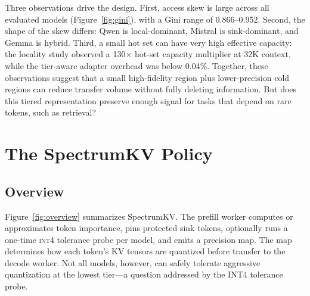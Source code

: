 \documentclass[11pt]{article}
\newcommand{\method}{SpectrumKV}
\newcommand{\pct}{\%}
\newcommand{\intiv}{\textsc{int4}}
\theoremstyle{plain}
\theoremstyle{definition}
\begin{document}
Three observations drive the design.  First, access skew is large across all evaluated models (Figure~\ref{fig:gini}), with a Gini range of 0.866--0.952.  Second, the shape of the skew differs: Qwen is local-dominant, Mistral is sink-dominant, and Gemma is hybrid.  Third, a small hot set can have very high effective capacity: the locality study observed a 130$\times$ hot-set capacity multiplier at 32K context, while the tier-aware adapter overhead was below 0.04\pct{}.  Together, these observations suggest that a small high-fidelity region plus lower-precision cold regions can reduce transfer volume without fully deleting information.  But does this tiered representation preserve enough signal for tasks that depend on rare tokens, such as retrieval?

\section{The \method{} Policy}
\label{sec:method}

\subsection{Overview}
Figure~\ref{fig:overview} summarizes \method{}.  The prefill worker computes or approximates token importance, pins protected sink tokens, optionally runs a one-time \intiv{} tolerance probe per model, and emits a precision map.  The map determines how each token's KV tensors are quantized before transfer to the decode worker.  Not all models, however, can safely tolerate aggressive quantization at the lowest tier---a question addressed by the INT4 tolerance probe.
\end{document}
